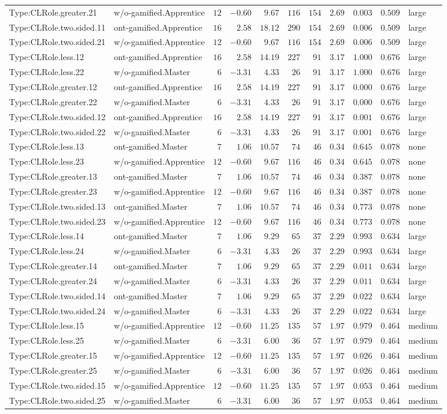 \documentclass[6pt,a4paper]{article}
\begin{document}
{\begin{longtable}{llrrrrrrrrl}
Type:CLRole.greater.21&w/o-gamified.Apprentice&$12$&$-0.60$&$ 9.67$&$116$&$154$&$2.69$&$0.003$&$0.509$&large\tabularnewline
Type:CLRole.two.sided.11&ont-gamified.Apprentice&$16$&$ 2.58$&$18.12$&$290$&$154$&$2.69$&$0.006$&$0.509$&large\tabularnewline
Type:CLRole.two.sided.21&w/o-gamified.Apprentice&$12$&$-0.60$&$ 9.67$&$116$&$154$&$2.69$&$0.006$&$0.509$&large\tabularnewline
Type:CLRole.less.12&ont-gamified.Apprentice&$16$&$ 2.58$&$14.19$&$227$&$ 91$&$3.17$&$1.000$&$0.676$&large\tabularnewline
Type:CLRole.less.22&w/o-gamified.Master&$ 6$&$-3.31$&$ 4.33$&$ 26$&$ 91$&$3.17$&$1.000$&$0.676$&large\tabularnewline
Type:CLRole.greater.12&ont-gamified.Apprentice&$16$&$ 2.58$&$14.19$&$227$&$ 91$&$3.17$&$0.000$&$0.676$&large\tabularnewline
Type:CLRole.greater.22&w/o-gamified.Master&$ 6$&$-3.31$&$ 4.33$&$ 26$&$ 91$&$3.17$&$0.000$&$0.676$&large\tabularnewline
Type:CLRole.two.sided.12&ont-gamified.Apprentice&$16$&$ 2.58$&$14.19$&$227$&$ 91$&$3.17$&$0.001$&$0.676$&large\tabularnewline
Type:CLRole.two.sided.22&w/o-gamified.Master&$ 6$&$-3.31$&$ 4.33$&$ 26$&$ 91$&$3.17$&$0.001$&$0.676$&large\tabularnewline
Type:CLRole.less.13&ont-gamified.Master&$ 7$&$ 1.06$&$10.57$&$ 74$&$ 46$&$0.34$&$0.645$&$0.078$&none\tabularnewline
Type:CLRole.less.23&w/o-gamified.Apprentice&$12$&$-0.60$&$ 9.67$&$116$&$ 46$&$0.34$&$0.645$&$0.078$&none\tabularnewline
Type:CLRole.greater.13&ont-gamified.Master&$ 7$&$ 1.06$&$10.57$&$ 74$&$ 46$&$0.34$&$0.387$&$0.078$&none\tabularnewline
Type:CLRole.greater.23&w/o-gamified.Apprentice&$12$&$-0.60$&$ 9.67$&$116$&$ 46$&$0.34$&$0.387$&$0.078$&none\tabularnewline
Type:CLRole.two.sided.13&ont-gamified.Master&$ 7$&$ 1.06$&$10.57$&$ 74$&$ 46$&$0.34$&$0.773$&$0.078$&none\tabularnewline
Type:CLRole.two.sided.23&w/o-gamified.Apprentice&$12$&$-0.60$&$ 9.67$&$116$&$ 46$&$0.34$&$0.773$&$0.078$&none\tabularnewline
Type:CLRole.less.14&ont-gamified.Master&$ 7$&$ 1.06$&$ 9.29$&$ 65$&$ 37$&$2.29$&$0.993$&$0.634$&large\tabularnewline
Type:CLRole.less.24&w/o-gamified.Master&$ 6$&$-3.31$&$ 4.33$&$ 26$&$ 37$&$2.29$&$0.993$&$0.634$&large\tabularnewline
Type:CLRole.greater.14&ont-gamified.Master&$ 7$&$ 1.06$&$ 9.29$&$ 65$&$ 37$&$2.29$&$0.011$&$0.634$&large\tabularnewline
Type:CLRole.greater.24&w/o-gamified.Master&$ 6$&$-3.31$&$ 4.33$&$ 26$&$ 37$&$2.29$&$0.011$&$0.634$&large\tabularnewline
Type:CLRole.two.sided.14&ont-gamified.Master&$ 7$&$ 1.06$&$ 9.29$&$ 65$&$ 37$&$2.29$&$0.022$&$0.634$&large\tabularnewline
Type:CLRole.two.sided.24&w/o-gamified.Master&$ 6$&$-3.31$&$ 4.33$&$ 26$&$ 37$&$2.29$&$0.022$&$0.634$&large\tabularnewline
Type:CLRole.less.15&w/o-gamified.Apprentice&$12$&$-0.60$&$11.25$&$135$&$ 57$&$1.97$&$0.979$&$0.464$&medium\tabularnewline
Type:CLRole.less.25&w/o-gamified.Master&$ 6$&$-3.31$&$ 6.00$&$ 36$&$ 57$&$1.97$&$0.979$&$0.464$&medium\tabularnewline
Type:CLRole.greater.15&w/o-gamified.Apprentice&$12$&$-0.60$&$11.25$&$135$&$ 57$&$1.97$&$0.026$&$0.464$&medium\tabularnewline
Type:CLRole.greater.25&w/o-gamified.Master&$ 6$&$-3.31$&$ 6.00$&$ 36$&$ 57$&$1.97$&$0.026$&$0.464$&medium\tabularnewline
\newpage
Type:CLRole.two.sided.15&w/o-gamified.Apprentice&$12$&$-0.60$&$11.25$&$135$&$ 57$&$1.97$&$0.053$&$0.464$&medium\tabularnewline
Type:CLRole.two.sided.25&w/o-gamified.Master&$ 6$&$-3.31$&$ 6.00$&$ 36$&$ 57$&$1.97$&$0.053$&$0.464$&medium\tabularnewline
\hline
\end{longtable}}
\end{document}
